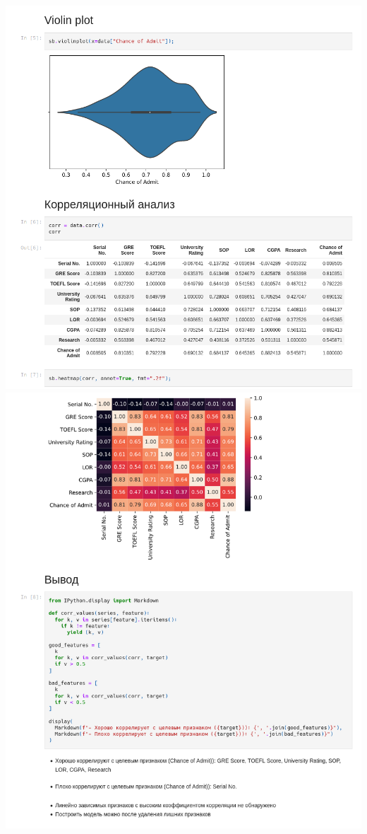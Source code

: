 \documentclass[a4paper]{article}
\begin{document}
  \includegraphics[scale=0.4]{55}
  \includegraphics[scale=0.4]{66}
\end{document}
